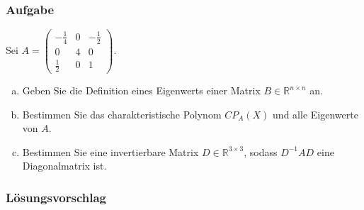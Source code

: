 \documentclass[a4paper,11pt]{scrartcl}
\newcounter{auf}
\newcommand{\Aufgabe}%
        {\addtocounter{auf}{1} \subsubsection*{\rmfamily  Aufgabe \theauf \hspace{1em}} }
\newcommand{\RR}{\mathbb{R}}
\begin{document}
\newpage
\Aufgabe
Sei $A=\begin{pmatrix} -\frac{1}{4} & 0 & -\frac{1}{2} \\ 0 & 4 & 0 \\ \frac{1}{2} & 0 &1 \end{pmatrix}$. 
\begin{enumerate}[a)]
\item Geben Sie die Definition eines Eigenwerts einer Matrix $B \in \RR^{n\times n}$ an.
\item Bestimmen Sie das charakteristische Polynom $CP_A(X)$ und alle Eigenwerte von $A$.
\item Bestimmen Sie eine invertierbare Matrix $D \in \RR^{3 \times 3}$, sodass $D^{-1}AD$ eine Diagonalmatrix ist.
\end{enumerate}
%
%
\subsubsection*{Lösungsvorschlag}
\end{document}
